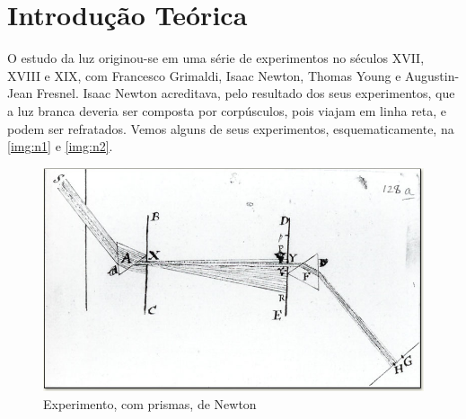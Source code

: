 \documentclass[
12pt,				%
openright,			%
oneside,			%
a4paper,			%
english,			%
french,				%
spanish,			%
brazil,				%
]{abntex2}
\begin{document}
\chapter[Introdução]{Introdução Teórica}

O estudo da luz originou-se em uma série de experimentos no séculos XVII, XVIII
e XIX, com Francesco Grimaldi, Isaac Newton, Thomas Young e Augustin-Jean Fresnel.
Isaac Newton acreditava, pelo resultado dos seus experimentos, que a luz branca
deveria ser composta por corpúsculos, pois viajam em linha reta, e podem ser
refratados. Vemos alguns de seus experimentos, esquematicamente, na \autoref{img:n1} e \autoref{img:n2}.

\begin{figure}[!htb]
	\caption{\label{img:n1} Experimento, com prismas, de Newton}
	\begin{center}
	  \includegraphics[scale=0.3]{./imagens/n1.jpg}
	\end{center}
\end{figure}
\end{document}
